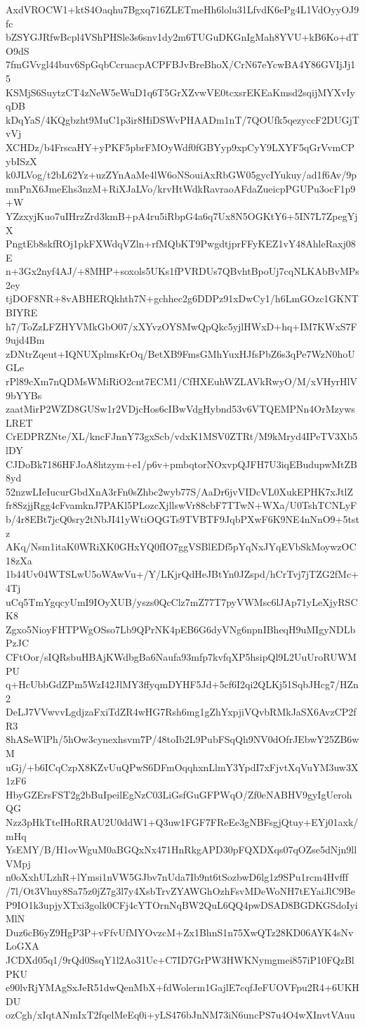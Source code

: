 AxdVROCW1+ktS4Oaqhu7Bgxq716ZLETmeHh6lolu31LfvdK6ePg4L1VdOyyOJ9fc
bZSYGJRfwBcpl4VShPHSle3s6snv1dy2m6TUGuDKGnIgMah8YVU+kB6Ko+dTO9dS
7fmGVvgl44buv6SpGqbCcruacpACPFBJvBreBhoX/CrN67eYcwBA4Y86GVIjJj15
KSMjS6SuytzCT4zNeW5eWuD1q6T5GrXZvwVE0tcxsrEKEaKmsd2sqijMYXvIyqDB
kDqYaS/4KQgbzht9MuC1p3ir8HiDSWvPHAADm1nT/7QOUfk5qezyccF2DUGjTvVj
XCHDz/b4FrscaHY+yPKF5pbrFMOyWdf0fGBYyp9xpCyY9LXYF5qGrVvmCPybISzX
k0JLVog/t2bL62Yz+uzZYnAaMe4lW6oNSouiAxRbGW05gycIYukuy/ad1f6Av/9p
mnPnX6JmeEhs3nzM+RiXJaLVo/krvHtWdkRavraoAFdaZueicpPGUPu3ocF1p9+W
YZzxyjKuo7uIHrzZrd3kmB+pA4ru5iRbpG4a6q7Ux8N5OGKtY6+5IN7L7ZpegYjX
PngtEb8skfROj1pkFXWdqVZln+rfMQbKT9PwgdtjprFFyKEZ1vY48AhleRaxj08E
n+3Gx2nyf4AJ/+8MHP+soxols5UKs1fPVRDUs7QBvhtBpoUj7cqNLKAbBvMPs2ey
tjDOF8NR+8vABHERQkhth7N+gchhec2g6DDPz91xDwCy1/h6LmGOzc1GKNTBIYRE
h7/ToZzLFZHYVMkGbO07/xXYvzOYSMwQpQkc5yjlHWxD+hq+IM7KWxS7F9ujd4Bm
zDNtrZqeut+IQNUXplmsKrOq/BetXB9FmsGMhYuxHJfsPbZ6s3qPe7WzN0hoUGLe
rPl89cXm7nQDMsWMiRiO2cnt7ECM1/CfHXEuhWZLAVkRwyO/M/xVHyrHlV9bYYBs
zaatMirP2WZD8GUSw1r2VDjcHos6cIBwVdgHybnd53v6VTQEMPNn4OrMzywsLRET
CrEDPRZNte/XL/kncFJnnY73gxScb/vdxK1MSV0ZTRt/M9kMryd4IPeTV3Xb5lDY
CJDoBk7186HFJoA8htzym+e1/p6v+pmbqtorNOxvpQJFH7U3iqEBudupwMtZB8yd
52nzwLIeIucurGbdXnA3rFn0sZhbc2wyb77S/AaDr6jvVIDcVL0XukEPHK7xJtlZ
fr8SzjjRgg4cFvamknJ7PAKl5PLozcXjllswVr88cbF7TTwN+WXa/U0TshTCNLyF
b/4r8EBt7jcQ0sry2tNbJI41yWtiOQGTs9TVBTF9JqbPXwF6K9NE4nNnO9+5tstz
AKq/Nsm1itaK0WRiXK0GHxYQ0fIO7ggVSBlEDf5pYqNxJYqEVbSkMoywzOC18zXa
1b44Uv04WTSLwU5oWAwVu+/Y/LKjrQdHeJBtYn0JZspd/hCrTvj7jTZG2fMc+4Tj
uCq5TmYgqcyUmI9IOyXUB/yszs0QcClz7mZ77T7pyVWMsc6lJAp71yLeXjyRSCK8
Zgxo5NioyFHTPWgOSso7Lb9QPrNK4pEB6G6dyVNg6npnIBheqH9uMIgyNDLbPzJC
CFtOor/sIQRsbuHBAjKWdbgBa6Naufa93mfp7kvfqXP5hsipQl9L2UuUroRUWMPU
q+HcUbbGdZPm5WzI42JlMY3ffyqmDYHF5Jd+5cf6I2qi2QLKj51SqbJHcg7/HZn2
DeLJ7VVwvvLgdjzaFxiTdZR4wHG7Rsh6mg1gZhYxpjiVQvbRMkJaSX6AvzCP2fR3
8hASeWlPh/5hOw3cynexhsvm7P/48toIb2L9PubFSqQh9NV0dOfrJEbwY25ZB6wM
uGj/+b6ICqCzpX8KZvUuQPwS6DFmOqqhxnLlmY3YpdI7xFjvtXqVuYM3uw3X1zF6
HbyGZErsFST2g2bBuIpeilEgNzC03LiGsfGuGFPWqO/Zf0eNABHV9gyIgUerohQG
Nzz3pHkTteIHoRRAU2U0ddW1+Q3uw1FGF7FReEe3gNBFsgjQtuy+EYj01axk/mHq
YsEMY/B/H1ovWguM0aBGQxNx471HnRkgAPD30pFQXDXqs07qOZse5dNjn9llVMpj
n0oXxhULzhR+lYmsi1nVW5GJbv7nUda7Ib9nt6tSozbwD6lg1z9SPu1rcm4Hvfff
/7l/Ot3Vhuy8Sa75z0jZ7g3l7y4XsbTrvZYAWGhOzhFsvMDeWoNH7tEYaiJlC9Be
P9IO1k3upjyXTxi3golk0CFj4cYTOrnNqBW2QuL6QQ4pwDSAD8BGDKGSdoIyiMlN
Duz6cB6yZ9HgP3P+vFfvUfMYOvzcM+Zx1BhnS1n75XwQTz28KD06AYK4sNvLoGXA
JCDXd05q1/9rQd0SsqY1l2Ao31Uc+C7ID7GrPW3HWKNymgmei857iP10FQzBlPKU
e90lvRjYMAgSxJeR51dwQenMbX+fdWolerm1GajlE7cqfJeFUOVFpu2R4+6UKHDU
ozCgh/xIqtANmIxT2fqelMeEq0i+yLS476bJnNM73iN6uncPS7u4O4wXInvtVAuu
